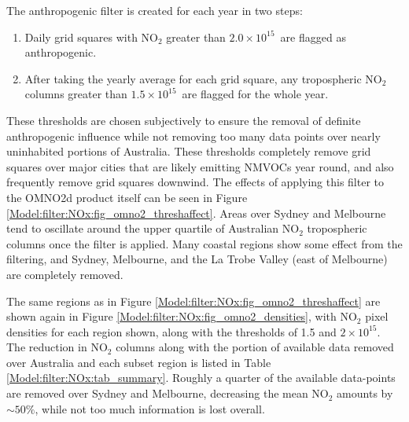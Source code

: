     The anthropogenic filter is created for each year in two steps:
    \begin{enumerate}
      \item Daily grid squares with NO$_2$ greater than $2.0 \times10^{15}$\moleccm  ~are flagged as anthropogenic.
      \item After taking the yearly average for each grid square, any tropospheric NO$_2$ columns greater than $1.5 \times 10^{15}$\moleccm ~are flagged for the whole year.
    \end{enumerate}
    These thresholds are chosen subjectively to ensure the removal of definite anthropogenic influence while not removing too many data points over nearly uninhabited portions of Australia.
    These thresholds completely remove grid squares over major cities that are likely emitting NMVOCs year round, and also frequently remove grid squares downwind.
    The effects of applying this filter to the OMNO2d product itself can be seen in Figure \ref{Model:filter:NOx:fig_omno2_threshaffect}.
    Areas over Sydney and Melbourne tend to oscillate around the upper quartile of Australian NO$_2$ tropospheric columns once the filter is applied.
    Many coastal regions show some effect from the filtering, and Sydney, Melbourne, and the La Trobe Valley (east of Melbourne) are completely removed.
    
    
    The same regions as in Figure \ref{Model:filter:NOx:fig_omno2_threshaffect} are shown again in Figure \ref{Model:filter:NOx:fig_omno2_densities}, with NO$_2$ pixel densities for each region shown, along with the thresholds of 1.5 and $2 \times 10^{15}$\moleccm.
    The reduction in NO$_2$ columns along with the portion of available data removed over Australia and each subset region is listed in Table \ref{Model:filter:NOx:tab_summary}.
    Roughly a quarter of the available data-points are removed over Sydney and Melbourne, decreasing the mean NO$_2$ amounts by $\sim{50}\%$, while not too much information is lost overall.
    
